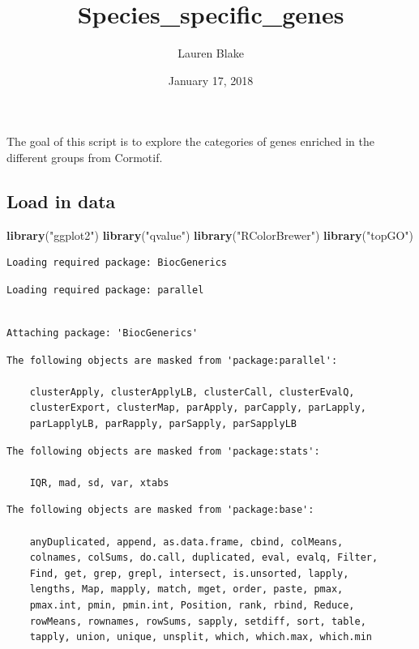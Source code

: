 \documentclass[]{article}
\title{Species\_specific\_genes}
\author{Lauren Blake}
\date{January 17, 2018}
\newenvironment{Shaded}{\begin{snugshade}}{\end{snugshade}}
\newcommand{\KeywordTok}[1]{\textcolor[rgb]{0.13,0.29,0.53}{\textbf{#1}}}
\newcommand{\StringTok}[1]{\textcolor[rgb]{0.31,0.60,0.02}{#1}}
\newcommand{\NormalTok}[1]{#1}
\begin{document}
\maketitle

The goal of this script is to explore the categories of genes enriched
in the different groups from Cormotif.

\subsection{Load in data}\label{load-in-data}

\begin{Shaded}
\begin{Highlighting}[]
\KeywordTok{library}\NormalTok{(}\StringTok{"ggplot2"}\NormalTok{)}
\KeywordTok{library}\NormalTok{(}\StringTok{"qvalue"}\NormalTok{)}
\KeywordTok{library}\NormalTok{(}\StringTok{"RColorBrewer"}\NormalTok{)}
\KeywordTok{library}\NormalTok{(}\StringTok{"topGO"}\NormalTok{)}
\end{Highlighting}
\end{Shaded}

\begin{verbatim}
Loading required package: BiocGenerics
\end{verbatim}

\begin{verbatim}
Loading required package: parallel
\end{verbatim}

\begin{verbatim}

Attaching package: 'BiocGenerics'
\end{verbatim}

\begin{verbatim}
The following objects are masked from 'package:parallel':

    clusterApply, clusterApplyLB, clusterCall, clusterEvalQ,
    clusterExport, clusterMap, parApply, parCapply, parLapply,
    parLapplyLB, parRapply, parSapply, parSapplyLB
\end{verbatim}

\begin{verbatim}
The following objects are masked from 'package:stats':

    IQR, mad, sd, var, xtabs
\end{verbatim}

\begin{verbatim}
The following objects are masked from 'package:base':

    anyDuplicated, append, as.data.frame, cbind, colMeans,
    colnames, colSums, do.call, duplicated, eval, evalq, Filter,
    Find, get, grep, grepl, intersect, is.unsorted, lapply,
    lengths, Map, mapply, match, mget, order, paste, pmax,
    pmax.int, pmin, pmin.int, Position, rank, rbind, Reduce,
    rowMeans, rownames, rowSums, sapply, setdiff, sort, table,
    tapply, union, unique, unsplit, which, which.max, which.min
\end{verbatim}
\end{document}
